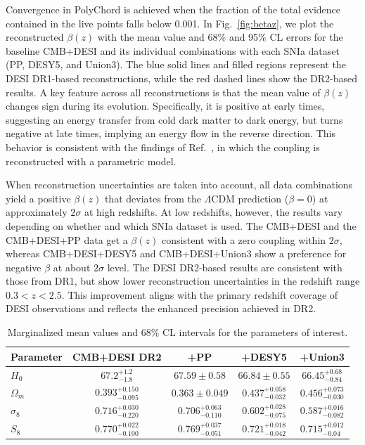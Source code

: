\documentclass[a4paper,11pt]{article}
\begin{document}
Convergence in PolyChord is achieved when the fraction of the total evidence contained in the live points  falls below 0.001. In Fig.~\ref{fig:betaz}, we plot the reconstructed $\beta(z)$ with the mean value and 68\% and 95\% CL errors for the baseline CMB+DESI and its individual combinations with each SNIa dataset (PP, DESY5, and Union3). The blue solid lines and filled regions represent the DESI DR1-based reconstructions, while the red dashed lines show the DR2-based results. A key feature across all reconstructions is that the mean value of $\beta(z)$ changes sign during its evolution. Specifically, it is positive at early times, suggesting an energy transfer from cold dark matter to dark energy, but turns negative at late times, implying an energy flow in the reverse direction. This behavior is consistent with the findings of Ref.~\cite{Li:2025owk}, in which the coupling is reconstructed with a parametric model. 

When reconstruction uncertainties are taken into account, all data combinations yield a positive $\beta(z)$ that deviates from the $\Lambda$CDM prediction ($\beta=0$) at approximately $2\sigma$ at high redshifts. At low redshifts, however, the results vary depending on whether and which SNIa dataset is used. The CMB+DESI and the CMB+DESI+PP data get a $\beta(z)$ consistent with a zero coupling within $2\sigma$, whereas CMB+DESI+DESY5 and CMB+DESI+Union3 show a preference for negative $\beta$ at about $2\sigma$ level. The DESI DR2-based results are consistent with those from DR1, but show lower reconstruction uncertainties in the redshift range $0.3 < z < 2.5$. This improvement aligns with the primary redshift coverage of DESI observations and reflects the enhanced precision achieved in DR2.

\begin{table}[!htbp]
  \renewcommand\arraystretch{1.5}
  \centering
  \caption{Marginalized mean values and 68\% CL intervals for the parameters of interest.}\label{tab:params}
\begin{tabular} { l  c c c c}
  \hline
  Parameter &  CMB+DESI DR2 &  +PP  &  +DESY5 &  +Union3\\
 \hline
 $H_0            $ & $67.2^{+1.2}_{-1.8}        $ & $67.59\pm 0.58             $ & $66.84\pm 0.55             $ & $66.45^{+0.68}_{-0.84}     $\\
 
 $\Omega_{m}         $ & $0.393^{+0.150}_{-0.095}    $ & $0.363\pm 0.049            $ & $0.437^{+0.058}_{-0.032}   $ & $0.456^{+0.073}_{-0.030}   $   \\

 $\sigma_8                  $ & $0.716^{+0.030}_{-0.220}    $ & $0.706^{+0.063}_{-0.110}    $ & $0.602^{+0.028}_{-0.075}   $ & $0.587^{+0.016}_{-0.082}   $\\
 
 $S_8$ & $0.770^{+0.022}_{-0.100}$ & $0.769^{+0.037}_{-0.051}$ & $0.721^{+0.018}_{-0.042}$ & $0.715^{+0.012}_{-0.04}$\\
 \hline
 \end{tabular}
 
\end{table}
\end{document}
